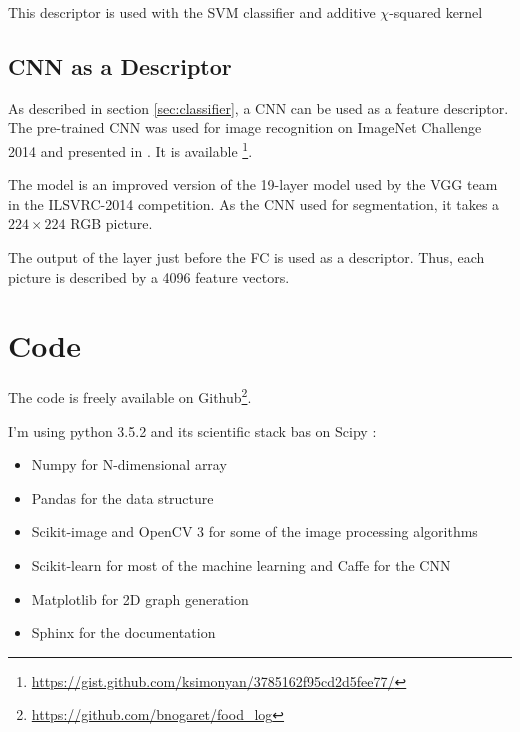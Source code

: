 This descriptor is used with the SVM classifier and additive $\chi$-squared kernel

\subsection{CNN as a Descriptor}

As described in section \ref{sec:classifier}, a CNN can be used as a feature descriptor. The pre-trained CNN was used for image recognition on ImageNet Challenge 2014 and presented in  \cite{Simonyan2014}. It is available \footnote{\url{https://gist.github.com/ksimonyan/3785162f95cd2d5fee77/}}.

The model is an improved version of the 19-layer model used by the VGG team in the ILSVRC-2014 competition. As the CNN used for segmentation, it takes a $224 \times 224$ RGB picture.

The output of the layer just before the FC is used as a descriptor. Thus, each picture is described by a 4096 feature vectors.

\section{Code}

The code is freely available on Github\footnote{\url{https://github.com/bnogaret/food_log}}.

I'm using python 3.5.2 and its scientific stack bas on Scipy \cite{Oliphant2007}:
\begin{itemize}
    \item Numpy \cite{VanDerWalt2011} for N-dimensional array
    \item Pandas \cite{McKinney2010} for the data structure
    \item Scikit-image \cite{VanderWalt2014} and OpenCV 3 \cite{Bradski2000} for some of the image processing algorithms
    \item Scikit-learn \cite{Pedregosa2012} for most of the machine learning and Caffe \cite{Jia2014a}  for the CNN
    \item Matplotlib \cite{Hunter2007} for 2D graph generation
    \item Sphinx for the documentation
\end{itemize}
